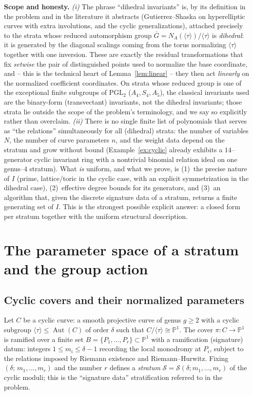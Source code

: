 \documentclass{amsart}
\theoremstyle{definition}
\DeclareMathOperator{\Aut}{Aut}
\begin{document}
\medskip
\noindent\textbf{Scope and honesty.}
\emph{(i)} The phrase ``dihedral invariants'' is, by its definition in the
problem and in the literature it abstracts (Gutierrez--Shaska on hyperelliptic
curves with extra involutions, and the cyclic generalizations), attached
precisely to the strata whose reduced automorphism group $\bar G=N_A(\langle\tau
\rangle)/\langle\tau\rangle$ is \emph{dihedral}: it is generated by the diagonal
scalings coming from the torus normalizing $\langle\tau\rangle$ together with one
inversion. These are exactly the residual transformations that fix
\emph{setwise} the pair of distinguished points used to normalize the base
coordinate, and -- this is the technical heart of
Lemma~\ref{lem:linear} -- they then act \emph{linearly} on the normalized
coefficient coordinates. On strata whose reduced group is one of the exceptional
finite subgroups of $\mathrm{PGL}_2$ ($A_4,S_4,A_5$), the classical invariants
used are the binary-form (transvectant) invariants, not the dihedral invariants;
those strata lie outside the scope of the problem's terminology, and we say so
explicitly rather than overclaim.
\emph{(ii)} There is no single finite list of polynomials that serves as ``the
relations'' simultaneously for all (dihedral) strata: the number of variables
$N$, the number of curve parameters $n$, and the weight data depend on the
stratum and grow without bound (Example~\ref{ex:cyclic} already exhibits a
$14$--generator cyclic invariant ring with a nontrivial binomial relation ideal
on one genus--$4$ stratum). What \emph{is} uniform, and what we prove, is
(1)~the precise nature of $I$ (prime, lattice/toric in the cyclic case, with an
explicit symmetrization in the dihedral case), (2)~effective degree bounds for
its generators, and (3)~an algorithm that, given the discrete signature data of a
stratum, returns a finite generating set of $I$. This is the strongest possible
explicit answer: a closed form per stratum together with the uniform structural
description.

\section{The parameter space of a stratum and the group action}\label{sec:setup}

\subsection{Cyclic covers and their normalized parameters}
Let $C$ be a cyclic curve: a smooth projective curve of genus $g\ge 2$ with a
cyclic subgroup $\langle\tau\rangle\le \Aut(C)$ of order $\delta$ such that
$C/\langle\tau\rangle\cong\mathbb{P}^1$. The cover $\pi:C\to\mathbb{P}^1$ is
ramified over a finite set $B=\{P_1,\dots,P_r\}\subset\mathbb{P}^1$ with a
ramification (signature) datum: integers
$1\le m_i\le \delta-1$ recording the local monodromy at $P_i$, subject to the
relations imposed by Riemann existence and Riemann--Hurwitz. Fixing
$(\delta;\,m_1,\dots,m_r)$ and the number $r$ defines a \emph{stratum}
$\mathcal{S}=\mathcal{S}(\delta;m_1,\dots,m_r)$ of the cyclic moduli; this is the
``signature data'' stratification referred to in the problem.
\end{document}
